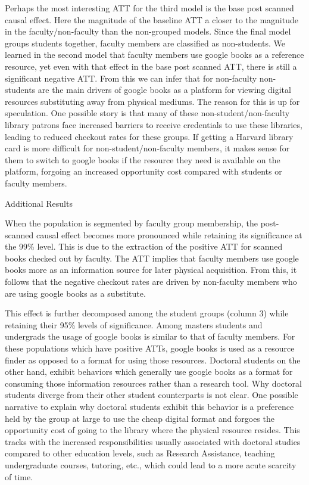 \documentclass{article}
\begin{document}
Perhaps the most interesting ATT for the third model is the base post scanned causal effect. Here the magnitude of the baseline ATT a closer to the magnitude in the faculty/non-faculty than the non-grouped models. Since the final model groups students together, faculty members are classified as non-students. We learned in the second model that faculty members use google books as a reference resource, yet even with that effect in the base post scanned ATT, there is still a significant negative ATT. From this we can infer that for non-faculty non-students are the main drivers of google books as a platform for viewing digital resources substituting away from physical mediums. The reason for this is up for speculation. One possible story is that many of these non-student/non-faculty library patrons face increased barriers to receive credentials to use these libraries, leading to reduced checkout rates for these groups. If getting a Harvard library card is more difficult for non-student/non-faculty members, it makes sense for them to switch to google books if the resource they need is available on the platform, forgoing an increased opportunity cost compared with students or faculty members.

\begin{table}[htbp]
   \centering
   \caption{Additional Results}
  
   \label{tab:booktabs}
\end{table}

When the population is segmented by faculty group membership, the post-scanned causal effect becomes more pronounced while retaining its significance at the 99\% level. This is due to the extraction of the positive ATT for scanned books checked out by faculty. The ATT implies that faculty members use google books more as an information source for later physical acquisition. From this, it follows that the negative checkout rates are driven by non-faculty members who are using google books as a substitute. 

This effect is further decomposed among the student groups (column 3) while retaining their 95\% levels of significance. Among masters students and undergrads the usage of google books is similar to that of faculty members. For these populations which have positive ATTs, google books is used as a resource finder as opposed to a format for using those resources. Doctoral students on the other hand, exhibit behaviors which generally use google books as a format for consuming those information resources rather than a research tool. Why doctoral students diverge from their other student counterparts is not clear. One possible narrative to explain why doctoral students exhibit this behavior is a preference held by the group at large to use the cheap digital format and forgoes the opportunity cost of going to the library where the physical resource resides. This tracks with the increased responsibilities usually associated with doctoral studies compared to other education levels, such as Research Assistance, teaching undergraduate courses, tutoring, etc., which could lead to a more acute scarcity of time.
\end{document}
